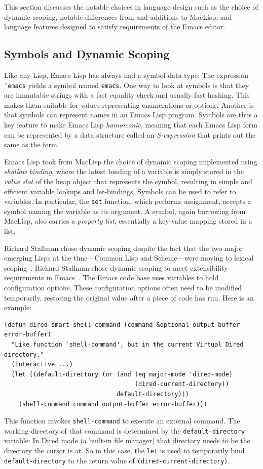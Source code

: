 \documentclass[format=acmsmall,screen]{acmart}
\newcommand \Elisp {Emacs Lisp}
\begin{document}
This section discusses the notable choices in language design such as
the choice of dynamic scoping, notable differences from and additions to
MacLisp, and language features designed to satisfy requirements of the
Emacs editor.

\subsection{Symbols and Dynamic Scoping}
\label{sec:symbols}

Like any Lisp, \Elisp{} has always had a symbol data type: The expression
\texttt{'emacs} yields a symbol named \texttt{emacs}.  One way to look
at symbols is that they are immutable strings with a fast equality
check and usually fast hashing.  This makes them suitable for values
representing enumerations or options.  Another is that symbols can
represent names in an \Elisp{} program.  Symbols are thus a key
feature to make \Elisp{} \textit{homoiconic}, meaning that each
\Elisp{} form can be represented by a data structure called an
\textit{S-expression} that prints out the same as the form.

\Elisp{} took from MacLisp the choice of dynamic scoping implemented using
\emph{shallow binding}, where the
latest binding of a variable is simply stored in the \emph{value slot}
of the heap object that represents the symbol, resulting in simple and efficient
variable lookups and let-bindings.  Symbols can be used to refer to
variables.  In particular, the \texttt{set} function, which performs
assignment, accepts a symbol naming the variable as its argument.
A symbol, again borrowing from
MacLisp, also carries a \textit{property list}, essentially a key-value
mapping stored in a list.

Richard
Stallman chose dynamic scoping despite the fact that the two major emerging
Lisps at the time---Common Lisp and Scheme---were moving to lexical
scoping~\cite{CLtL1,R2RS}.
Richard Stallman chose dynamic scoping to meet extensibility
requirements in Emacs~\cite{Stallman1981}.  The Emacs code base uses
variables to hold configuration options.  These configuration
options often need to be modified temporarily, restoring the original
value after a piece of code has run.  Here is an example:
%
\begin{verbatim}
(defun dired-smart-shell-command (command &optional output-buffer error-buffer)
  "Like function `shell-command', but in the current Virtual Dired directory."
  (interactive ...)
  (let ((default-directory (or (and (eq major-mode 'dired-mode)
                                    (dired-current-directory))
                               default-directory)))
    (shell-command command output-buffer error-buffer)))
\end{verbatim}
%
This function invokes \texttt{shell-command} to execute an external
command.  The working directory of that command is determined by the
\texttt{default-directory} variable: In Dired mode (a built-in file
manager) that directory needs to be the directory the cursor is at.
So in this case, the \texttt{let} is used to temporarily bind
\texttt{default-directory} to the return value of
\texttt{(dired-current-directory)}.
\end{document}
